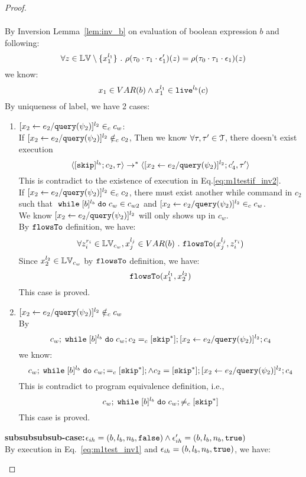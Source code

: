 \begin{proof}
\begin{case}[$\trace_2 = \trace_{ih} \cdot \event_{ih}$]
\begin{subcase}
\begin{subsubcase}
\begin{subproof}
\[\begin{array}{l}
\end{array}
 \]
By Inversion Lemma~\ref{lem:inv_b} on evaluation of boolean expression $b$ and following: 
\[
  \forall z \in \mathbb{LV} \setminus \{x_1^{l_1}\} ~.~
  \rho(\mathtt{\tau}_0 \cdot \mathtt{\tau}_1 \cdot \mathtt{\epsilon}_1')(z) = \rho(\mathtt{\tau}_0 \cdot \mathtt{\tau}_1 \cdot \mathtt{\epsilon}_1)(z)
\]
we know:
\[
  x_1 \in VAR(b) \land x_1^{l_1} \in \mathtt{live}^{l_b}(c)
\]
%
 By uniqueness of label, we have 2 cases:
 \begin{enumerate}
 \item $[\mathrel{ {x}_2 \leftarrow e_2 / {\tt query}(\psi_2) }]^{l_2} \in_c c_w$:
 \\
 If $[\mathrel{ {x}_2 \leftarrow e_2 / {\tt query}(\psi_2) }]^{l_2} \notin_c c_2$,
 Then we know $\forall \mathtt{\tau}, \mathtt{\tau}' \in \mathcal{T}$, there doesn't exist execution
 \[
  \langle [\mathtt{skip}]^{l_b};c_2, \mathtt{\tau} \rangle \rightarrow^{*} 
  \langle [\mathrel{ {x}_2 \leftarrow e_2 / {\tt query}(\psi_2) }]^{l_2};{c}_4', \mathtt{\tau}' \rangle
 \]
 This is contradict to the existence of execution in Eq.\ref{eq:m1testif_inv2}.
 \\
  If $[\mathrel{ {x}_2 \leftarrow e_2 / {\tt query}(\psi_2) }]^{l_2} \in_c c_2$, there must exist another while command
   in $c_2$ such that 
  $\;\mathtt{while}\; [b]^{l_b} \;\mathtt{do}\; c_w \in c_{w2}$ and $[\mathrel{ {x}_2 \leftarrow e_2 / {\tt query}(\psi_2) }]^{l_2} \in_c c_w$.
  \\
  We know $[\mathrel{ {x}_2 \leftarrow e_2 / {\tt query}(\psi_2) }]^{l_2}$ will only shows up in $c_w$.
  \\
  By $\mathtt{flowsTo}$ definition, we have:
  \[
    \forall z_i^{r_i} \in \mathbb{LV}_{c_w}, x_j^{l_j} \in VAR(b) ~.~
    \mathtt{flowsTo}(x_j^{l_j}, z_i^{r_i})
  \]
  Since $x_2^{l_2} \in \mathbb{LV}_{c_w}$ by $\mathtt{flowsTo}$ definition, we have: 
  \[
    \mathtt{flowsTo}(x_1^{l_1}, x_2^{l_2})
  \]
  This case is proved.
 \item $[\mathrel{ {x}_2 \leftarrow e_2 / {\tt query}(\psi_2) }]^{l_2} \notin_c c_w$
 \\
 By
 \[
  c_w;\;\mathtt{while}\; [b]^{l_b} \;\mathtt{do}\; c_w; c_2 =_c [\mathtt{skip}^*]; [\mathrel{ {x}_2 \leftarrow e_2 / {\tt query}(\psi_2) }]^{l_2};{c}_4
\]
we know:
\[
  c_w;\;\mathtt{while}\; [b]^{l_b} \;\mathtt{do}\; c_w; =_c [\mathtt{skip}^*]; \land c_2 = [\mathtt{skip}^*]; [\mathrel{ {x}_2 \leftarrow e_2 / {\tt query}(\psi_2) }]^{l_2};{c}_4
\]
This is contradict to program equivalence definition, i.e.,
\[
  c_w;\;\mathtt{while}\; [b]^{l_b} \;\mathtt{do}\; c_w; \neq_c [\mathtt{skip}^*]
\]
This case is proved.
%
 \end{enumerate}
%
\textbf{subsubsubsub-case:}$\mathtt{\epsilon}_{ih} = (b, l_b, n_b, \mathtt{false}) \land \mathtt{\epsilon}_{ih}' = (b, l_b, n_b, \mathtt{true})$
\\
By execution in Eq.~\ref{eq:m1test_inv1} and $\mathtt{\epsilon}_{ih} = (b, l_b, n_b, \mathtt{true})$, we have:

\end{subproof}
\end{subsubcase}
\end{subcase}
\end{case}
\end{proof}
